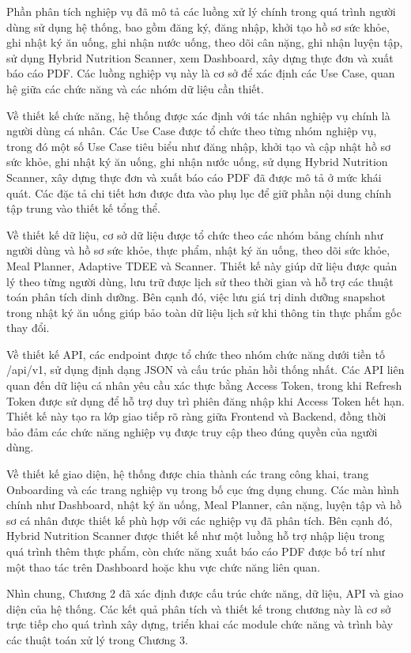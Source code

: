 Phần phân tích nghiệp vụ đã mô tả các luồng xử lý chính trong quá trình người dùng sử dụng hệ thống, bao gồm đăng ký, đăng nhập, khởi tạo hồ sơ sức khỏe, ghi nhật ký ăn uống, ghi nhận nước uống, theo dõi cân nặng, ghi nhận luyện tập, sử dụng Hybrid Nutrition Scanner, xem Dashboard, xây dựng thực đơn và xuất báo cáo PDF. Các luồng nghiệp vụ này là cơ sở để xác định các Use Case, quan hệ giữa các chức năng và các nhóm dữ liệu cần thiết.

Về thiết kế chức năng, hệ thống được xác định với tác nhân nghiệp vụ chính là người dùng cá nhân. Các Use Case được tổ chức theo từng nhóm nghiệp vụ, trong đó một số Use Case tiêu biểu như đăng nhập, khởi tạo và cập nhật hồ sơ sức khỏe, ghi nhật ký ăn uống, ghi nhận nước uống, sử dụng Hybrid Nutrition Scanner, xây dựng thực đơn và xuất báo cáo PDF đã được mô tả ở mức khái quát. Các đặc tả chi tiết hơn được đưa vào phụ lục để giữ phần nội dung chính tập trung vào thiết kế tổng thể.

Về thiết kế dữ liệu, cơ sở dữ liệu được tổ chức theo các nhóm bảng chính như người dùng và hồ sơ sức khỏe, thực phẩm, nhật ký ăn uống, theo dõi sức khỏe, Meal Planner, Adaptive TDEE và Scanner. Thiết kế này giúp dữ liệu được quản lý theo từng người dùng, lưu trữ được lịch sử theo thời gian và hỗ trợ các thuật toán phân tích dinh dưỡng. Bên cạnh đó, việc lưu giá trị dinh dưỡng snapshot trong nhật ký ăn uống giúp bảo toàn dữ liệu lịch sử khi thông tin thực phẩm gốc thay đổi.

Về thiết kế API, các endpoint được tổ chức theo nhóm chức năng dưới tiền tố /api/v1, sử dụng định dạng JSON và cấu trúc phản hồi thống nhất. Các API liên quan đến dữ liệu cá nhân yêu cầu xác thực bằng Access Token, trong khi Refresh Token được sử dụng để hỗ trợ duy trì phiên đăng nhập khi Access Token hết hạn. Thiết kế này tạo ra lớp giao tiếp rõ ràng giữa Frontend và Backend, đồng thời bảo đảm các chức năng nghiệp vụ được truy cập theo đúng quyền của người dùng.

Về thiết kế giao diện, hệ thống được chia thành các trang công khai, trang Onboarding và các trang nghiệp vụ trong bố cục ứng dụng chung. Các màn hình chính như Dashboard, nhật ký ăn uống, Meal Planner, cân nặng, luyện tập và hồ sơ cá nhân được thiết kế phù hợp với các nghiệp vụ đã phân tích. Bên cạnh đó, Hybrid Nutrition Scanner được thiết kế như một luồng hỗ trợ nhập liệu trong quá trình thêm thực phẩm, còn chức năng xuất báo cáo PDF được bố trí như một thao tác trên Dashboard hoặc khu vực chức năng liên quan.

Nhìn chung, Chương 2 đã xác định được cấu trúc chức năng, dữ liệu, API và giao diện của hệ thống. Các kết quả phân tích và thiết kế trong chương này là cơ sở trực tiếp cho quá trình xây dựng, triển khai các module chức năng và trình bày các thuật toán xử lý trong Chương 3.


